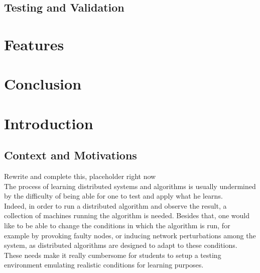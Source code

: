 \documentclass{eplmastersthesis}
\begin{document}
    \section{Testing and Validation}



  \chapter{Features}

  \chapter{Conclusion}








  \chapter{Introduction}

    \section{Context and Motivations}



      {\color{red} Rewrite and complete this, placeholder right now}\\

      The process of learning distributed systems and algorithms is usually
      undermined by the difficulty of being able for one to test and apply
      what he learns.\\
      Indeed, in order to run a distributed algorithm and observe the result, a
      collection of machines running the algorithm is needed. Besides that,
      one would like to be able to change the conditions in which the algorithm
      is run, for example by provoking faulty nodes, or inducing network
      perturbations among the system, as distributed algorithms are designed to
      adapt to these conditions. These needs make it really cumbersome
      for students to setup a testing environment emulating realistic
      conditions for learning purposes.
\end{document}
